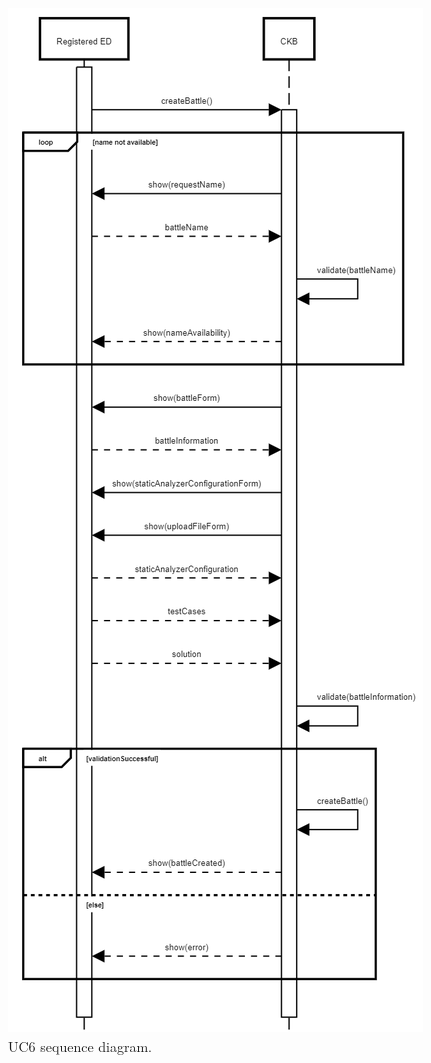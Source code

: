 \begin{center}
  \begin{figure} [H]
    \begin{center}
        \includegraphics[width=\textwidth,height=\textheight,keepaspectratio]{Images/SequenceDiagrams/UC6.png}
        \caption{UC6 sequence diagram.}
        \label{fig: UC6_sequence_diagram}
    \end{center}
  \end{figure}
\end{center}

